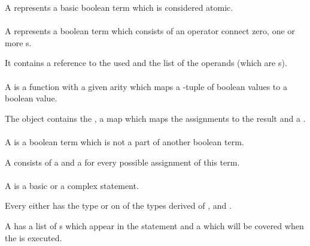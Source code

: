 A  represents a basic boolean term which is considered
atomic.

\paragraph{}

A  represents a boolean term which consists of an operator
connect zero, one or more s.

It contains a reference to the  used and the list of the
operands (which are s).

\paragraph{}

A  is a function with a given arity  which maps
a -tuple of boolean values to a boolean value.

The object contains the , a map which maps the assignments to the
result and a .

\paragraph{}

A  is a boolean term which is not a part of another boolean term.

A  consists of a  and a 
for every possible assignment of this term.

\paragraph{}

A  is a basic or a complex statement.

Every  either has the type  or on of
the types derived of ,  and
.

A  has a list of s which appear in the statement
and a  which will be covered when the 
is executed.

\paragraph{}

